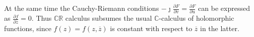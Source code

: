 \documentclass{article}
\newcommand{\real}{\mathbb{R}}
\newcommand{\cplx}{\mathbb{C}}
\newcommand{\iu}{{\jmath}}
\newcommand{\conj}[1]{\overline{#1}}
\begin{document}
At the same time the Cauchy-Riemann conditions $
  -\iu \tfrac{\partial F}{\partial v} = \tfrac{\partial F}{\partial u}
$ can be expressed as $
  \tfrac{\partial f}{\partial \conj{z}} = 0
$. Thus $\cplx\real$ calculus subsumes the usual $\cplx$-calculus of holomorphic functions,
since $f(z) = f(z, \conj{z})$ is constant with respect to $\conj{z}$ in the latter. 
\end{document}
